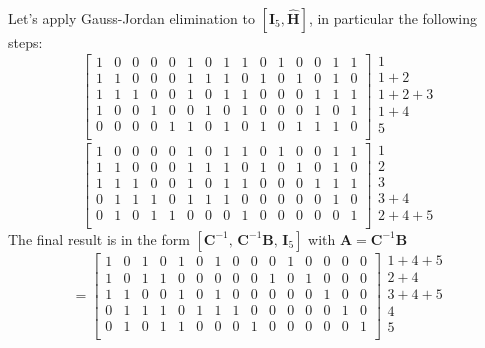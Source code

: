 \documentclass[10pt]{article}
\begin{document}
Let's apply Gauss-Jordan elimination to $[\mathbf{I}_5, \mathbf{\hat{H}}]$, in particular the following steps:
\begin{equation}
	\left[
	\begin{array}{ccccccccccccccc}
		1&0&0&0&0&1&0&1&1&0&1&0&0&1&1\\
		1&1&0&0&0&1&1&1&0&1&0&1&0&1&0\\
		1&1&1&0&0&1&0&1&1&0&0&0&1&1&1\\
		1&0&0&1&0&0&1&0&1&0&0&0&1&0&1\\
		0&0&0&0&1&1&0&1&0&1&0&1&1&1&0\\
	\end{array}
	\right]
	\begin{array}{l}
		1 \\
		1 + 2 \\
		1 + 2 + 3 \\
		1 + 4 \\
		5 \\
	\end{array}
\end{equation}
\begin{equation}
	\left[
	\begin{array}{ccccccccccccccc}
		1&0&0&0&0&1&0&1&1&0&1&0&0&1&1\\
		1&1&0&0&0&1&1&1&0&1&0&1&0&1&0\\
		1&1&1&0&0&1&0&1&1&0&0&0&1&1&1\\
		0&1&1&1&0&1&1&1&0&0&0&0&0&1&0\\
		0&1&0&1&1&0&0&0&1&0&0&0&0&0&1\\
	\end{array}
	\right]
	\begin{array}{l}
		1 \\
		2 \\
		3 \\
		3 + 4 \\
		2 + 4 + 5 \\
	\end{array}
\end{equation}
The final result is in the form $[\mathbf{C}^{-1}, \, \mathbf{C}^{-1}\mathbf{B}, \, \mathbf{I}_{5}]$ with $\mathbf{A} = \mathbf{C}^{-1}\mathbf{B}$
\begin{equation}
	[\mathbf{C}^{-1}, \mathbf{C}^{-1}\mathbf{B}, \mathbf{I}_{5}] = 
	\left[
	\begin{array}{ccccccccccccccc}
		1&0&1&0&1&0&1&0&0&0&1&0&0&0&0\\
		1&0&1&1&0&0&0&0&0&1&0&1&0&0&0\\
		1&1&0&0&1&0&1&0&0&0&0&0&1&0&0\\
		0&1&1&1&0&1&1&1&0&0&0&0&0&1&0\\
		0&1&0&1&1&0&0&0&1&0&0&0&0&0&1\\
	\end{array}
	\right]
	\begin{array}{l}
		1 + 4 + 5 \\
		2 + 4 \\
		3 + 4 + 5 \\
		4 \\
		5 \\
	\end{array}
\end{equation}
\end{document}
